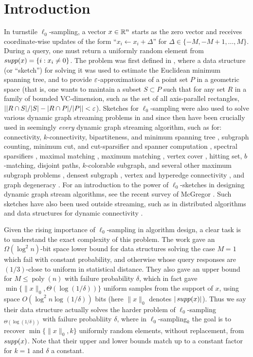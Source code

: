 \section{Introduction}
In turnstile $\ell_0$-sampling, a vector $x\in\mathbb{R}^n$ starts as the zero vector and receives coordinate-wise updates of the form ``$x_i \leftarrow x_i + \Delta$'' for $\Delta\in\{-M,-M+1,\ldots,M\}$. During a query, one must return a uniformly random element from $\mathop{supp}(x) = \{i : x_i\neq 0\}$. The problem was first defined in \cite{FrahlingIS08}, where a data structure (or ``sketch'') for solving it was used to estimate the Euclidean minimum spanning tree, and to provide $\varepsilon$-approximations of a point set $P$ in a geometric space (that is, one wants to maintain a subset $S\subset P$ such that for any set $R$ in a family of bounded VC-dimension, such as the set of all axis-parallel rectangles, $||R\cap S|/|S| - |R\cap P|/|P|| < \varepsilon$). Sketches for $\ell_0$-sampling were also used to solve various dynamic graph streaming problems in \cite{AhnGM12a} and since then have been crucially used in seemingly {\em every} dynamic graph streaming algorithm, such as for: connectivity, $k$-connectivity, bipartiteness, and minimum spanning tree \cite{AhnGM12a}, subgraph counting, minimum cut, and cut-sparsifier and spanner computation \cite{AhnGM12b}, spectral sparsifiers \cite{AhnGM13}, maximal matching \cite{ChitnisCHM15}, maximum matching \cite{AhnGM12a,BuryS15,Konrad15,AssadiKLY16,ChitnisCEHMMV16,AssadiKL17}, vertex cover \cite{ChitnisCHM15,ChitnisCEHMMV16}, hitting set, $b$-matching, disjoint paths, $k$-colorable subgraph, and several other maximum subgraph problems \cite{ChitnisCEHMMV16}, densest subgraph \cite{BhattacharyaHNT15,McGregorTVV15,EsfandiariHW16}, vertex and hyperedge connectivity \cite{GuhaMT15}, and graph degeneracy \cite{FarachColtonT16}. For an introduction to the power of $\ell_0$-sketches in designing dynamic graph stream algorithms, see the recent survey of McGregor \cite[Section 3]{McGregor14}. Such sketches have also been used outside streaming, such as in distributed algorithms \cite{HegemanPPSS15,Pandurangan0S16} and data structures for dynamic connectivity \cite{KapronKM13,Wang15,GibbKKT15}.

Given the rising importance of $\ell_0$-sampling in algorithm design, a clear task is to understand the exact complexity of this problem. The work \cite{JowhariST11} gave an $\Omega(\log^2 n)$-bit space lower bound for data structures solving the case $M=1$ which fail with constant probability, and otherwise whose query responses are $(1/3)$-close to uniform in statistical distance. They also gave an upper bound for $M \le \mathop{poly}(n)$ with failure probability $\delta$, which in fact gave $\min\{\|x\|_0, \Theta(\log(1/\delta))\}$ uniform samples from the support of $x$, using space $O(\log^2 n \log(1/\delta))$ bits (here $\|x\|_0$ denotes $|\mathop{supp}(x)|$). Thus we say their data structure actually solves the harder problem of $\ell_0$-sampling$_{\Theta(\log(1/\delta))}$ with failure probabliity $\delta$, where in $\ell_0$-sampling$_k$ the goal is to recover $\min\{\|x\|_0, k\}$ uniformly random elements, without replacement, from $\mathop{supp}(x)$. Note that their upper and lower bounds match up to a constant factor for $k = 1$ and $\delta$ a constant.

